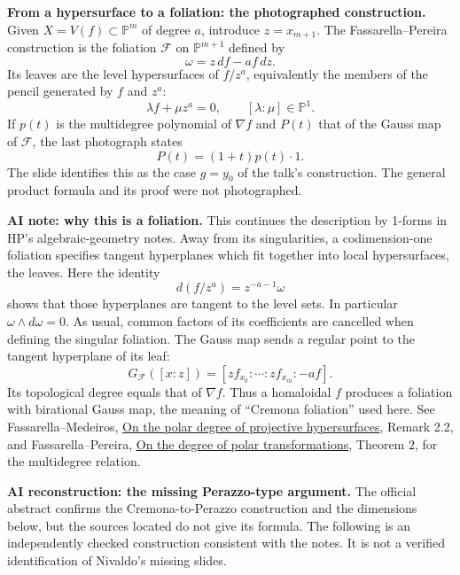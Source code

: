 \medskip\noindent
\textbf{From a hypersurface to a
foliation: the photographed construction.}
Given $X=V(f)\subset\mathbb{P}^m$ of
degree $a$, introduce $z=x_{m+1}$.
The Fassarella--Pereira construction is
the foliation $\mathcal{F}$ on
$\mathbb{P}^{m+1}$ defined by
$$
\omega=z\,df-af\,dz.
$$
Its leaves are the level hypersurfaces of
$f/z^a$, equivalently the members of the
pencil generated by $f$ and $z^a$:
$$
\lambda f+\mu z^a=0,
\qquad [\lambda:\mu]\in\mathbb{P}^1.
$$
If $p(t)$ is the multidegree polynomial
of $\nabla f$ and $P(t)$ that of the
Gauss map of $\mathcal{F}$, the last
photograph states
$$
P(t)=(1+t)p(t)\cdot1.
$$
The slide identifies this as the case
$g=y_0$ of the talk's construction.
The general product formula and its proof
were not photographed.

\medskip\noindent
\textbf{AI note: why this is a foliation.}
This continues the description by
1-forms in HP's algebraic-geometry notes.
Away from its singularities, a
codimension-one foliation specifies
tangent hyperplanes which fit together
into local hypersurfaces, the leaves.
Here the identity
$$
d(f/z^a)=z^{-a-1}\omega
$$
shows that those hyperplanes are tangent
to the level sets. In particular
$\omega\wedge d\omega=0$.
As usual, common factors of its
coefficients are cancelled when defining
the singular foliation.
The Gauss map sends a regular point to
the tangent hyperplane of its leaf:
$$
G_{\mathcal{F}}([x:z])=
[z f_{x_0}:\cdots:z f_{x_m}:-af].
$$
Its topological degree equals that of
$\nabla f$. Thus a homaloidal $f$
produces a foliation with birational
Gauss map, the meaning of ``Cremona
foliation'' used here.
See Fassarella--Medeiros,
\href{https://arxiv.org/abs/1108.2676}
{On the polar degree of projective
hypersurfaces}, Remark 2.2, and
Fassarella--Pereira,
\href{https://arxiv.org/abs/0705.1867}
{On the degree of polar transformations},
Theorem 2, for the multidegree relation.

\medskip\noindent
\textbf{AI reconstruction: the missing
Perazzo-type argument.}
The official abstract confirms the
Cremona-to-Perazzo construction and the
dimensions below, but the sources located
do not give its formula.
The following is an independently checked
construction consistent with the
notes. It is not
a verified identification of Nivaldo's
missing slides.


